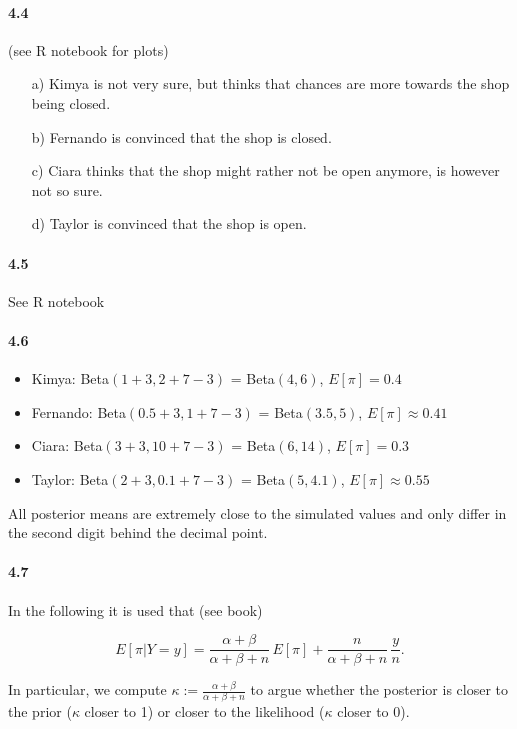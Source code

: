 \documentclass[fontsize=11pt,DIV=18,parskip=half]{scrartcl}
\begin{document}
\paragraph{4.4} (see R notebook for plots)
\begin{enumerate}
\item[a)] Kimya is not very sure, but thinks that chances are more towards the shop being closed.
\item[b)] Fernando is convinced that the shop is closed.
\item[c)] Ciara thinks that the shop might rather not be open anymore, is however not so sure.
\item[d)] Taylor is convinced that the shop is open.
\end{enumerate}

\paragraph{4.5} See R notebook

\paragraph{4.6}
\begin{itemize}
\item Kimya: Beta$(1 + 3, 2 + 7-3)$ = Beta$(4, 6)$, $E[\pi] = 0.4$
\item Fernando: Beta$(0.5 + 3, 1 + 7-3)$ = Beta$(3.5, 5)$, $E[\pi] \approx 0.41$
\item Ciara: Beta$(3 + 3, 10 + 7-3)$ = Beta$(6, 14)$, $E[\pi] = 0.3$
\item Taylor: Beta$(2 + 3, 0.1 + 7-3)$ = Beta$(5, 4.1)$, $E[\pi] \approx 0.55$
\end{itemize}

All posterior means are extremely close to the simulated values and only differ in the second digit behind the decimal point.

\paragraph{4.7}
In the following it is used that (see book)

\begin{equation*}
E[\pi|Y=y] = \frac{\alpha+\beta}{\alpha+\beta+n} \, E[\pi] + \frac{n}{\alpha+\beta+n} \, \frac{y}{n}.
\end{equation*}

In particular, we compute $\kappa := \frac{\alpha+\beta}{\alpha+\beta+n}$ to argue whether the posterior is closer to the prior ($\kappa$ closer to 1) or closer to the likelihood ($\kappa$ closer to 0).
\end{document}
